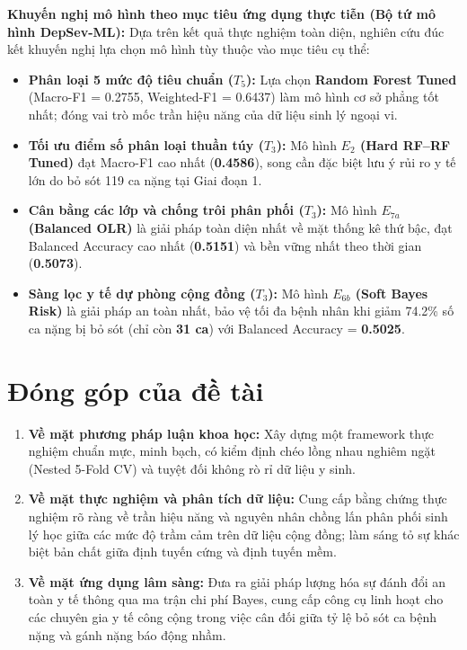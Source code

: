 \textbf{Khuyến nghị mô hình theo mục tiêu ứng dụng thực tiễn (Bộ tứ mô hình DepSev-ML):}
Dựa trên kết quả thực nghiệm toàn diện, nghiên cứu đúc kết khuyến nghị lựa chọn mô hình tùy thuộc vào mục tiêu cụ thể:
\begin{itemize}
    \item \textbf{Phân loại 5 mức độ tiêu chuẩn ($T_5$):} Lựa chọn \textbf{Random Forest Tuned} (Macro-F1 = 0.2755, Weighted-F1 = 0.6437) làm mô hình cơ sở phẳng tốt nhất; đóng vai trò mốc trần hiệu năng của dữ liệu sinh lý ngoại vi.
    \item \textbf{Tối ưu điểm số phân loại thuần túy ($T_3$):} Mô hình \textbf{$E_2$ (Hard RF--RF Tuned)} đạt Macro-F1 cao nhất (\textbf{0.4586}), song cần đặc biệt lưu ý rủi ro y tế lớn do bỏ sót 119 ca nặng tại Giai đoạn 1.
    \item \textbf{Cân bằng các lớp và chống trôi phân phối ($T_3$):} Mô hình \textbf{$E_{7a}$ (Balanced OLR)} là giải pháp toàn diện nhất về mặt thống kê thứ bậc, đạt Balanced Accuracy cao nhất (\textbf{0.5151}) và bền vững nhất theo thời gian (\textbf{0.5073}).
    \item \textbf{Sàng lọc y tế dự phòng cộng đồng ($T_3$):} Mô hình \textbf{$E_{6b}$ (Soft Bayes Risk)} là giải pháp an toàn nhất, bảo vệ tối đa bệnh nhân khi giảm 74.2\% số ca nặng bị bỏ sót (chỉ còn \textbf{31 ca}) với Balanced Accuracy = \textbf{0.5025}.
\end{itemize}

\section{Đóng góp của đề tài}
\label{sec:dong-gop-de-tai}

\begin{enumerate}
    \item \textbf{Về mặt phương pháp luận khoa học:} Xây dựng một framework thực nghiệm chuẩn mực, minh bạch, có kiểm định chéo lồng nhau nghiêm ngặt (Nested 5-Fold CV) và tuyệt đối không rò rỉ dữ liệu y sinh.
    \item \textbf{Về mặt thực nghiệm và phân tích dữ liệu:} Cung cấp bằng chứng thực nghiệm rõ ràng về trần hiệu năng và nguyên nhân chồng lấn phân phối sinh lý học giữa các mức độ trầm cảm trên dữ liệu cộng đồng; làm sáng tỏ sự khác biệt bản chất giữa định tuyến cứng và định tuyến mềm.
    \item \textbf{Về mặt ứng dụng lâm sàng:} Đưa ra giải pháp lượng hóa sự đánh đổi an toàn y tế thông qua ma trận chi phí Bayes, cung cấp công cụ linh hoạt cho các chuyên gia y tế công cộng trong việc cân đối giữa tỷ lệ bỏ sót ca bệnh nặng và gánh nặng báo động nhầm.
\end{enumerate}

